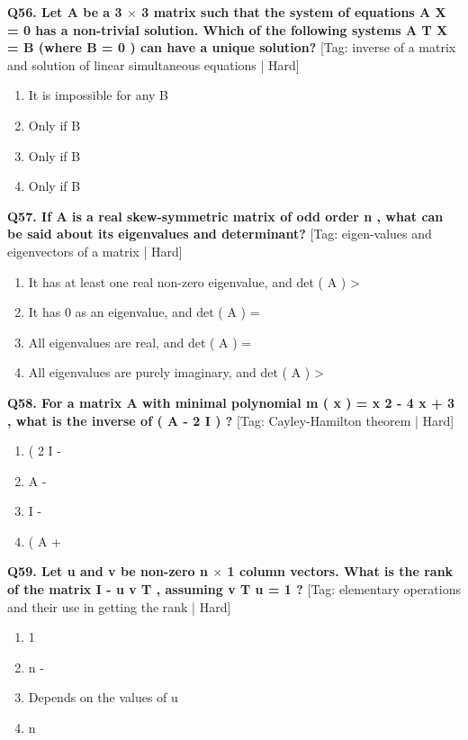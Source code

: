 \noindent\textbf{Q56. Let A be a 3 $\times$ 3 matrix such that the system of equations A X = 0 has a non-trivial solution. Which of the following systems A T X = B (where B  = 0 ) can have a unique solution?} \hfill [Tag: inverse of a matrix and solution of linear simultaneous equations | Hard]
\begin{enumerate}[label=(\alph*),topsep=2pt,itemsep=1pt,partopsep=0pt,parsep=0pt]
    \item {{It is impossible for any B}}
    \item {{Only if B}}
    \item {{Only if B}}
    \item {{Only if B}}
\end{enumerate}
\vspace{2mm}

\noindent\textbf{Q57. If A is a real skew-symmetric matrix of odd order n , what can be said about its eigenvalues and determinant?} \hfill [Tag: eigen-values and eigenvectors of a matrix | Hard]
\begin{enumerate}[label=(\alph*),topsep=2pt,itemsep=1pt,partopsep=0pt,parsep=0pt]
    \item {{It has at least one real non-zero eigenvalue, and det ( A ) >}}
    \item {{It has 0 as an eigenvalue, and det ( A ) =}}
    \item {{All eigenvalues are real, and det ( A ) =}}
    \item {{All eigenvalues are purely imaginary, and det ( A ) >}}
\end{enumerate}
\vspace{2mm}

\noindent\textbf{Q58. For a matrix A with minimal polynomial m ( x ) = x 2 - 4 x + 3 , what is the inverse of ( A - 2 I ) ?} \hfill [Tag: Cayley-Hamilton theorem | Hard]
\begin{enumerate}[label=(\alph*),topsep=2pt,itemsep=1pt,partopsep=0pt,parsep=0pt]
    \item {{( 2 I -}}
    \item {{A -}}
    \item {{I -}}
    \item {{( A +}}
\end{enumerate}
\vspace{2mm}

\noindent\textbf{Q59. Let u and v be non-zero n $\times$ 1 column vectors. What is the rank of the matrix I - u v T , assuming v T u  = 1 ?} \hfill [Tag: elementary operations and their use in getting the rank | Hard]
\begin{enumerate}[label=(\alph*),topsep=2pt,itemsep=1pt,partopsep=0pt,parsep=0pt]
    \item {{1}}
    \item {{n -}}
    \item {{Depends on the values of u}}
    \item {{n}}
\end{enumerate}
\vspace{2mm}


